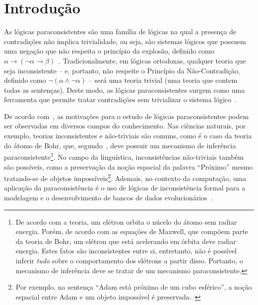 \chapter{Introdução}\label{cap:Introducao}


As lógicas paraconsistentes são uma família de lógicas na qual a presença de contradições não implica trivialidade, ou seja, são sistemas lógicos que possuem uma negação que não respeita o princípio da explosão, definido como $\alpha \to (\neg \alpha \to \beta)$~\cite{carnielli2007}. Tradicionalmente, em lógicas ortodoxas, qualquer teoria que seja inconsistente {--} e, portanto, não respeite o Princípio da Não-Contradição, definido como $\neg (\alpha \land \neg \alpha)$ {--} será uma teoria trivial (uma teoria que contem todas as sentenças). Deste modo, as lógicas paraconsistentes surgem como uma ferramenta que permite tratar contradições sem trivializar o sistema lógico~\cite{Carnielli_Coniglio_2016}.

De acordo com~, as motivações para o estudo de lógicas paraconsistentes podem ser observadas em diversos campos do conhecimento. Nas ciências naturais, por exemplo, teorias inconsistentes e não-triviais são comuns, como é o caso da teoria do átomo de Bohr, que, segundo~, deve possuir um mecanismo de inferência paraconsistente\footnote{De acordo com a teoria, um elétron orbita o núcelo do átomo sem radiar energia. Porém, de acordo com as equações de Maxwell, que compõem parte da teoria de Bohr, um elétron que está acelerando em órbita deve radiar energia. Estes fatos são inconsistentes entre si, entretanto, não é possível inferir \textit{tudo} sobre o comportamento dos elétrons a partir disso. Portanto, o mecanismo de inferência deve se tratar de um mecanismo paraconsistente.}. No campo da linguística, inconsistências não-triviais também são possíveis, como a preservação da noção espacial da palavra ``Próximo'' mesmo tratando-se de objetos impossíveis\footnote{Por exemplo, na sentença ``Adam está próximo de um cubo esférico'', a noção espacial entre Adam e um objeto impossível é preservada.~\cite{McGinnis2013-MCGTUA}}. Ademais, no contexto da computação, uma aplicação da paraconsistência é o uso de lógicas de inconsistência formal para a modelagem e o desenvolvimento de bancos de dados evolucionários~\cite{carnielli2000formal}.

